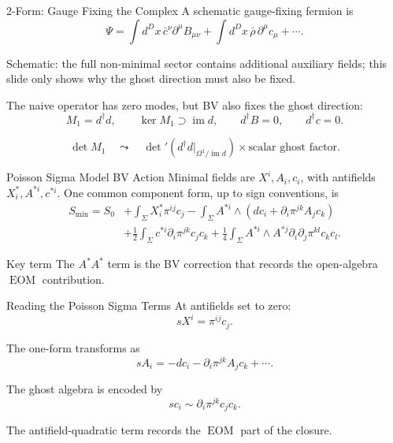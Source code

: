 \documentclass[aspectratio=169,professionalfonts]{beamer}
\newcommand{\slidecite}[1]{{\scriptsize\color{CourseGold}#1}}
\newcommand{\EOM}{\ensuremath{\operatorname{EOM}}}
\begin{document}
\begin{frame}{2-Form: Gauge Fixing the Complex}
  A schematic gauge-fixing fermion is
  \[
    \Psi
    =\int d^Dx\,
    \bar c^\nu\partial^\mu B_{\mu\nu}
    +\int d^Dx\,\bar\rho\,\partial^\mu c_\mu+\cdots .
  \]

  \slidecite{Schematic: the full non-minimal sector contains additional auxiliary fields; this slide only shows why the ghost direction must also be fixed.}

  The naive operator has zero modes, but BV also fixes the ghost direction:
  \[
    M_1=d^\dagger d,
    \qquad
    \ker M_1\supset \operatorname{im}d,
    \qquad
    d^\dagger B=0,
    \qquad
    d^\dagger c=0 .
  \]

  \[
    \det M_1
    \quad\leadsto\quad
    \det{}'\!\left(d^\dagger d\big|_{\Omega^1/\operatorname{im}d}\right)
    \times
    \text{scalar ghost factor}.
  \]
\end{frame}

\begin{frame}{Poisson Sigma Model BV Action}
  \small
  Minimal fields are $X^i,A_i,c_i$, with antifields $X_i^*,A^{*i},c^{*i}$.
  One common component form, up to sign conventions, is
  \[
  \begin{aligned}
    S_{\min}=S_0
    &+\int_\Sigma X_i^*\pi^{ij}c_j
    -\int_\Sigma A^{*i}\wedge
    \left(dc_i+\partial_i\pi^{jk}A_jc_k\right)\\
    &+\frac12\int_\Sigma c^{*i}\partial_i\pi^{jk}c_jc_k
    +\frac14\int_\Sigma A^{*i}\wedge A^{*j}
    \partial_i\partial_j\pi^{kl}c_kc_l .
  \end{aligned}
  \]

  \begin{alertblock}{Key term}
    The $A^*A^*$ term is the BV correction that records the open-algebra
    \EOM{} contribution.
  \end{alertblock}
\end{frame}

\begin{frame}{Reading the Poisson Sigma Terms}
  At antifields set to zero:
  \[
    sX^i=\pi^{ij}c_j .
  \]

  The one-form transforms as
  \[
    sA_i=-dc_i-\partial_i\pi^{jk}A_jc_k+\cdots .
  \]

  The ghost algebra is encoded by
  \[
    sc_i\sim \partial_i\pi^{jk}c_jc_k .
  \]

  The antifield-quadratic term records the \EOM{} part of the closure.
\end{frame}
\end{document}
